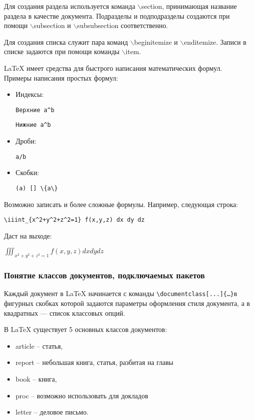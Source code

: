 \documentclass[10pt,a4paper]{article}
\begin{document}
Для создания раздела используется команда $\backslash$section, принимающая название раздела в качестве документа. Подразделы и подподразделы создаются при помощи $\backslash$subsection и $\backslash$subsubsection соответственно.

Для создания списка служит пара команд $\backslash$begin{itemize} и $\backslash$end{itemize}. Записи в списке задаются при помощи команды $\backslash$item.

LaTeX имеет средства для быстрого написания математических формул. Примеры написания простых формул:
\begin{itemize}
\item Индексы:
\begin{verbatim}Верхние a^b
\end{verbatim}
\begin{verbatim}Нижние a^b
\end{verbatim}
\item Дроби:
\begin{verbatim}a/b
\end{verbatim}
\item Скобки:
\begin{verbatim}(a) [] \{a\}
\end{verbatim}
\end{itemize}

Возможно записать и более сложные формулы. Например, следующая строка: \begin{center}
\begin{verbatim}
\iiint_{x^2+y^2+z^2=1} f(x,y,z) dx dy dz
\end{verbatim}
\end{center}

Даст на выходе:
\begin{center}
$\iiint_{x^2+y^2+z^2=1} f(x,y,z) dx dy dz $
\end{center}
\subsubsection{Понятие классов документов, подключаемых пакетов}
Каждый документ в LaTeX начинается с команды \verb+\documentclass[...]{…}+в фигурных скобках которой задаются параметры оформления стиля документа, а в квадратных — список классовых опций.

В LaTeX существует 5 основных классов документов: 
\begin{itemize}
\item article -- статья,
\item report -- небольшая книга, статья, разбитая на главы
\item book -- книга,
\item proc -- возможно использовать для докладов
\item letter -- деловое письмо. 
\end{itemize}
\end{document}
